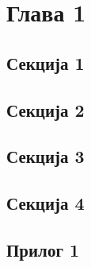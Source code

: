 \documentclass{report}
\begin{document}
\chapter{Глава 1}
\label{ch:glava1}

\section{Секција 1}

\section{Секција 2}

\section{Секција 3}

\section{Секција 4}

\printbibliography

\begin{appendices}

\chapter{Прилог 1}

\end{appendices}
\end{document}
